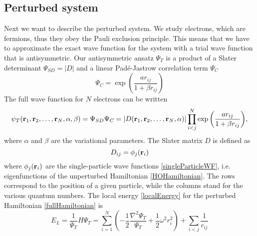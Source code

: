 \documentclass[english, a4paper]{article}
\begin{document}
\subsection{Perturbed system}
Next we want to describe the perturbed system. 
We study electrons, which are fermions, thus they obey the Pauli exclusion principle.
This means that we have to approximate the exact wave function for the system with a trial
wave function that is antisymmetric. Our antisymmetric ansatz $\Psi_T$ is a product of a 
Slater determinant $\Psi_{SD} = |D|$ and a linear Padé-Jastrow correlation term $\Psi_C$ 
\begin{equation}
 \Psi_C = \exp{\left(\frac{a r_{ij}}{1+\beta r_{ij}}\right)}
 \label{correlationFunction}
\end{equation}
The full wave function for $N$ electrons can be written
\begin{equation}
   \psi_{T}({\bf r}_1,{\bf r}_2,\dots, {\bf r}_N, \alpha, \beta) = \Psi_{SD}\Psi_C = 
   |D({\bf r}_1,{\bf r}_2,\dots, {\bf r}_N, \alpha)|
   \prod_{i<j}^{N}\exp{\left(\frac{a r_{ij}}{1+\beta r_{ij}}\right)}, 
   \label{trialWF}
\end{equation}
where $\alpha$ and $\beta$ are the variational parameters.
The Slater matrix $D$ is defined as
\begin{equation}
 D_{ij} = \phi_j({\bf r}_i)
 \label{slaterMatrix}
\end{equation}
where $\phi_j({\bf r}_i)$ are the single-particle wave functions \eqref{singleParticleWF}, 
i.e. eigenfunctions of the unperturbed
Hamiltonian \eqref{HOHamiltonian}. The rows correspond to the position of a given particle, 
while the columns stand for the various quantum numbers.
The local energy \eqref{localEnergy}
for the perturbed Hamiltonian \eqref{fullHamiltonian} is
\begin{equation}
 E_L = \frac{1}{\Psi_T}H\Psi_T = \sum_{i=1}^N \left( -\frac{1}{2}\frac{\nabla^2\Psi_T}{\Psi_T} + 
 \frac{1}{2}\omega^2r_i^2 \right) + \sum_{i<j}\frac{1}{r_{ij}}
\end{equation}
\end{document}

